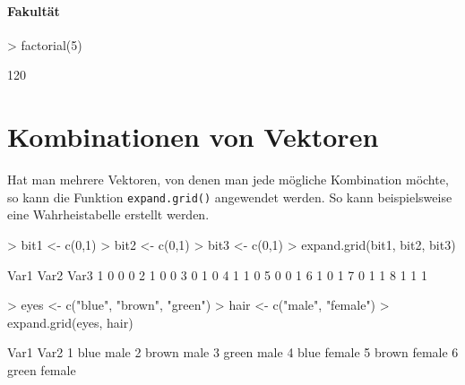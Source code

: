 \paragraph{Fakultät}
\begin{Schunk}
\begin{Sinput}
> factorial(5)
\end{Sinput}
\begin{Soutput}
[1] 120
\end{Soutput}
\end{Schunk}

\section{Kombinationen von Vektoren}
Hat man mehrere Vektoren, von denen man jede mögliche
Kombination möchte, so kann die Funktion 
\lstinline{expand.grid()} angewendet werden.
So kann beispielsweise eine Wahrheistabelle erstellt werden.
\begin{Schunk}
\begin{Sinput}
> bit1 <- c(0,1)
> bit2 <- c(0,1)
> bit3 <- c(0,1)
> expand.grid(bit1, bit2, bit3)
\end{Sinput}
\begin{Soutput}
  Var1 Var2 Var3
1    0    0    0
2    1    0    0
3    0    1    0
4    1    1    0
5    0    0    1
6    1    0    1
7    0    1    1
8    1    1    1
\end{Soutput}
\end{Schunk}

\begin{Schunk}
\begin{Sinput}
> eyes <- c("blue", "brown", "green")
> hair <- c("male", "female")
> expand.grid(eyes, hair)
\end{Sinput}
\begin{Soutput}
   Var1   Var2
1  blue   male
2 brown   male
3 green   male
4  blue female
5 brown female
6 green female
\end{Soutput}
\end{Schunk}

